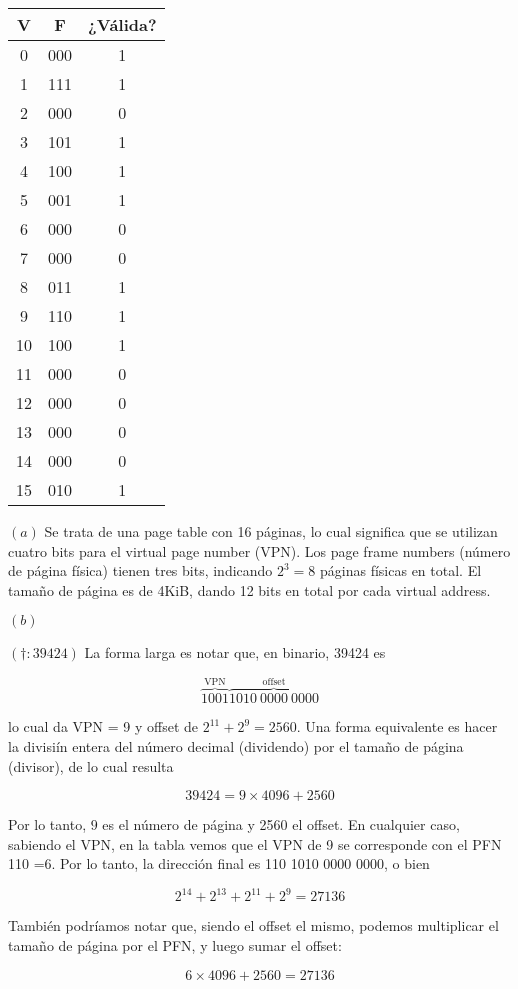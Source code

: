 \documentclass[12pt]{article}
\theoremstyle{definition}
\begin{document}
    \begin{table}[h]
\centering
\begin{tabular}{|c|c|c|}
\hline
V & F   & ¿Válida? \\ \hline
0  & 000 & 1 \\ \hline
1  & 111 & 1 \\ \hline
2  & 000 & 0 \\ \hline
3  & 101 & 1 \\ \hline
4  & 100 & 1 \\ \hline
5  & 001 & 1 \\ \hline
6  & 000 & 0 \\ \hline
7  & 000 & 0 \\ \hline
8  & 011 & 1 \\ \hline
9  & 110 & 1 \\ \hline
10 & 100 & 1 \\ \hline
11 & 000 & 0 \\ \hline
12 & 000 & 0 \\ \hline
13 & 000 & 0 \\ \hline
14 & 000 & 0 \\ \hline
15 & 010 & 1 \\ \hline
\end{tabular}
\end{table}

$(a)$ Se trata de una page table con 16 páginas, lo cual significa que se
utilizan cuatro bits para el virtual page number (VPN). Los page frame numbers
(número de página física) tienen tres bits, indicando $2^3 = 8$ páginas físicas
en total. El tamaño de página es de 4KiB, dando 12 bits en total por cada
virtual address.

$(b)$

$(\dagger: 39424)$ La forma larga es notar que, en binario, 39424 es 

\begin{equation*}
    \overbrace{1001}^{\text{VPN}}\overbrace{1010 ~ 0000 ~ 0000}^{\text{offset}}
\end{equation*}

lo cual da VPN = 9 y offset de $2^{11} + 2^{9} = 2560$. Una forma equivalente es
hacer la divisiín entera del número decimal (dividendo) por el tamaño de página
(divisor), de lo cual resulta 

\begin{equation*}
    39424 = 9 \times 4096 + 2560
\end{equation*}
 
Por lo tanto, $9$ es el número de página y 2560 el offset. En cualquier caso,
sabiendo el VPN, en la tabla vemos que el VPN de 9 se corresponde con el PFN
110 =6. Por lo tanto, la dirección final es 110 1010 0000 0000, o bien 

\begin{equation*}
    2^{14} + 2^{13} + 2^{11} + 2^{9} = 27136
\end{equation*}

También podríamos notar que, siendo el offset el mismo, podemos multiplicar
el tamaño de página por el PFN, y luego sumar el offset:

\begin{equation*}
    6 \times 4096 + 2560 = 27136
\end{equation*}
\end{document}
